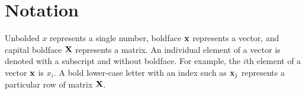 
\inbpdocument

\chapter*{Notation}
\label{ch:notation}


Unbolded $x$ represents a single number, boldface ${\bf{x}}$ represents a vector, and capital boldface $\mathbf{X}$ represents a matrix.
An individual element of a vector is denoted with a subscript and without boldface.
For example, the $i$th element of a vector ${\bf{x}}$ is $x_i$.
A bold lower-case letter with an index such as ${\bf{x}}_j$ represents a particular row of matrix $\mathbf{X}$.

\vspace{1cm}

